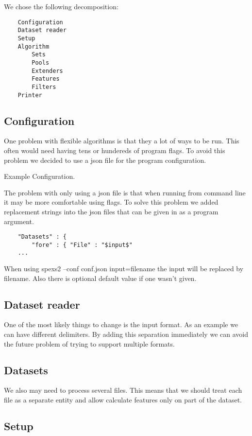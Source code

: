 We chose the following decomposition:

\begin{verbatim}
	Configuration
	Dataset reader
	Setup
	Algorithm
		Sets
		Pools
		Extenders
		Features
		Filters
	Printer
\end{verbatim}

\subsection{Configuration}

One problem with flexible algorithms is that they a lot of ways to be run.
This often would need having tens or hundereds of program flags.
To avoid this problem we decided to use a json file for the program
configuration.

Example Configuration.

The problem with only using a json file is that when running from
command line it may be more comfortable using flags. To solve this problem
we added replacement strings into the json files that can be given in as
a program argument.

\begin{verbatim}
	"Datasets" : {
		"fore" : { "File" : "$input$"
	...
\end{verbatim}

When using spexs2 --conf conf.json input=filename the input will be
replaced by filename. Also there is optional default value if
one wasn't given.

\subsection{Dataset reader}

One of the most likely things to change is the input format. As an 
example we can have different delimiters. By adding this separation
immediately we can avoid the future problem of trying to support multiple
formats.

\subsection{Datasets}

We also may need to process several files. This means that we should
treat each file as a separate entity and allow calculate features
only on part of the dataset.

\subsection{Setup}


